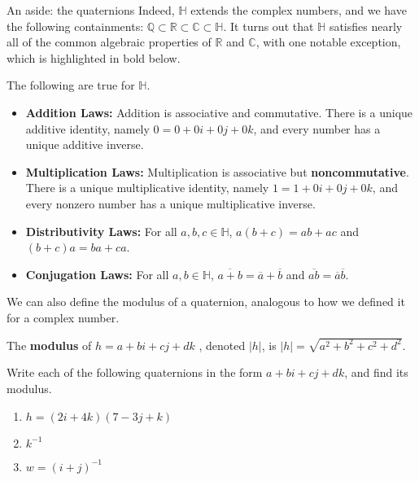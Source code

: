 \begin{section}{An aside: the quaternions}
Indeed, $\mathbb{H}$ extends the complex numbers, and we have the following containments: $\mathbb{Q}\subset\mathbb{R}\subset\mathbb{C}\subset\mathbb{H}$. It turns out that $\mathbb{H}$ satisfies nearly all of the common algebraic properties of $\mathbb{R}$ and $\mathbb{C}$, with one notable exception, which is highlighted in bold below.

\begin{fact}\label{fact.QuaternionLaws} The following are true for $\mathbb{H}$.
\begin{itemize}
\item \textbf{Addition Laws:} Addition is associative and commutative. There is a unique additive identity, namely $0 = 0 + 0i+0j+0k$, and every number has a unique additive inverse.
\item \textbf{Multiplication Laws:} Multiplication is associative but \textbf{noncommutative}. There is a unique multiplicative identity, namely $1 = 1 + 0i+0j+0k$, and every nonzero number has a unique multiplicative inverse.
\item \textbf{Distributivity Laws:} For all $a,b,c \in \mathbb{H}$, $a(b+c) = ab+ac$ and $(b+c)a = ba+ca$.
\item \textbf{Conjugation Laws:} For all $a,b \in \mathbb{H}$, $\overline{a+b} = \overline{a} + \overline{b}$ and $\overline{ab} = \overline{a}\overline{b}$.
\end{itemize}
\end{fact}

We can also define the modulus of a quaternion, analogous to how we defined it for a complex number.

\begin{definition}
The \textbf{modulus} of $h=a + bi+ cj + dk$ , denoted $|h|$, is $|h| = \sqrt{a^2 + b^2+c^2+d^2}$. 
\end{definition}

\begin{problem}\label{prob.QuaternionCheckin}
Write each of the following quaternions in the form $a+bi+cj+dk$, and find its modulus.
\begin{multicols}{2}
\begin{enumerate}
\item $h = (2i+4k)(7-3j+k)$
\item $k^{-1}$
\item $w = (i+j)^{-1}$
\end{enumerate}
\end{multicols}
\end{problem}


\end{section}
